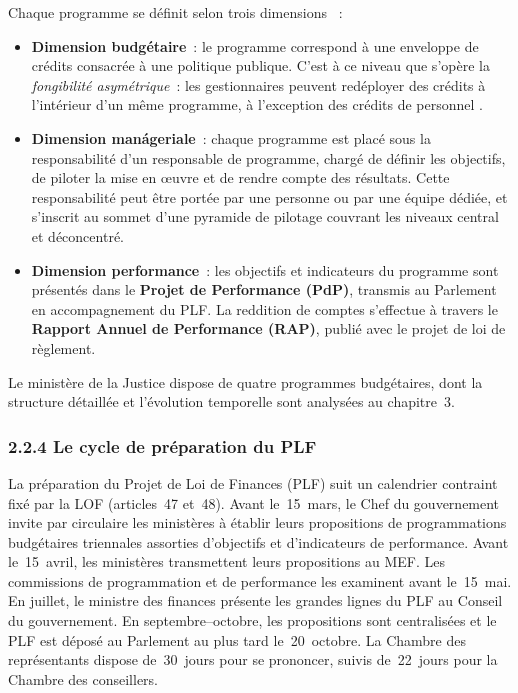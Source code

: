 Chaque programme se d\'efinit selon trois dimensions \citep{MEF2015b}~:

\begin{itemize}
    \item \textbf{Dimension budg\'etaire}~: le programme correspond \`a une enveloppe de cr\'edits consacr\'ee \`a une politique publique. C'est \`a ce niveau que s'op\`ere la \textit{fongibilit\'e asym\'etrique}~: les gestionnaires peuvent red\'eployer des cr\'edits \`a l'int\'erieur d'un m\^eme programme, \`a l'exception des cr\'edits de personnel \citep{Abdelali2019}.

    \item \textbf{Dimension man\'ageriale}~: chaque programme est plac\'e sous la responsabilit\'e d'un responsable de programme, charg\'e de d\'efinir les objectifs, de piloter la mise en \oe{}uvre et de rendre compte des r\'esultats. Cette responsabilit\'e peut \^etre port\'ee par une personne ou par une \'equipe d\'edi\'ee, et s'inscrit au sommet d'une pyramide de pilotage couvrant les niveaux central et d\'econcentr\'e.

    \item \textbf{Dimension performance}~: les objectifs et indicateurs du programme sont pr\'esent\'es dans le \textbf{Projet de Performance (PdP)}, transmis au Parlement en accompagnement du PLF. La reddition de comptes s'effectue \`a travers le \textbf{Rapport Annuel de Performance (RAP)}, publi\'e avec le projet de loi de r\`eglement.
\end{itemize}

Le minist\`ere de la Justice dispose de quatre programmes budg\'etaires, dont la structure d\'etaill\'ee et l'\'evolution temporelle sont analys\'ees au chapitre~3.

\subsubsection*{2.2.4 \quad Le cycle de pr\'eparation du PLF}

La pr\'eparation du Projet de Loi de Finances (PLF) suit un calendrier contraint fix\'e par la LOF (articles~47 et~48). Avant le~15~mars, le Chef du gouvernement invite par circulaire les minist\`eres \`a \'etablir leurs propositions de programmations budg\'etaires triennales assorties d'objectifs et d'indicateurs de performance. Avant le~15~avril, les minist\`eres transmettent leurs propositions au MEF. Les commissions de programmation et de performance les examinent avant le~15~mai. En juillet, le ministre des finances pr\'esente les grandes lignes du PLF au Conseil du gouvernement. En septembre--octobre, les propositions sont centralis\'ees et le PLF est d\'epos\'e au Parlement au plus tard le~20~octobre. La Chambre des repr\'esentants dispose de~30~jours pour se prononcer, suivis de~22~jours pour la Chambre des conseillers.

